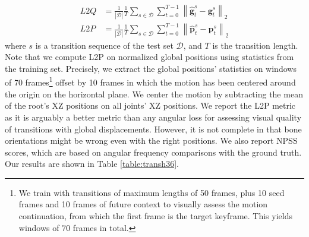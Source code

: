 \documentclass[acmtog]{acmart}
\newcommand\norm[1]{\left\lVert#1\right\rVert}
\newcommand{\bp}{\textbf{p}}
\newcommand{\bg}{\textbf{g}}
\begin{document}
\begin{align}
    L2Q &= \frac{1}{|\mathcal{D}|}\frac{1}{T} \sum_{s \in \mathcal{D}} \sum_{t=0}^{T-1} \norm{\hat{\bg}_t^s - \bg_t^s}_2\\
    L2P &= \frac{1}{|\mathcal{D}|}\frac{1}{T} \sum_{s \in \mathcal{D}} \sum_{t=0}^{T-1} \norm{\hat{\bp}_t^s - \bp_t^s}_2
\end{align}
where $s$ is a transition sequence of the test set $\mathcal{D}$, and $T$ is the transition length. Note that we compute L2P on normalized global positions using statistics from the training set. Precisely, we extract the global positions' statistics on windows of 70 frames\footnote{We train with transitions of maximum lengths of 50 frames, plus 10 seed frames and 10 frames of future context to visually assess the motion continuation, from which the first frame is the target keyframe. This yields windows of 70 frames in total.} offset by 10 frames in which the motion has been centered around the origin on the horizontal plane. We center the motion by subtracting the mean of the root's XZ positions on all joints' XZ positions. We report the L2P metric as it is arguably a better metric than any angular loss for assessing visual quality of transitions with global displacements. However, it is not complete in that bone orientations might be wrong even with the right positions. We also report NPSS scores, which are based on angular frequency comparisons with the ground truth. Our results are shown in Table \ref{table:transh36}.
\end{document}
